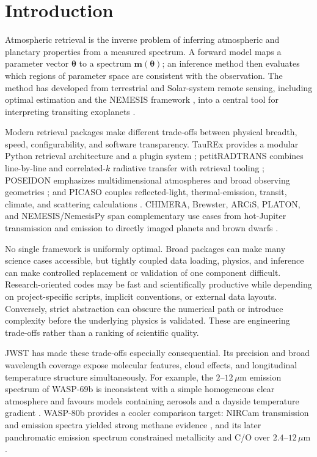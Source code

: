 \section{Introduction}
\label{sec:introduction}

Atmospheric retrieval is the inverse problem of inferring atmospheric and
planetary properties from a measured spectrum. A forward model maps a parameter
vector $\boldsymbol{\theta}$ to a spectrum $\boldsymbol{m}(\boldsymbol{\theta})$;
an inference method then evaluates which regions of parameter space are
consistent with the observation. The method has developed from terrestrial and
Solar-system remote sensing, including optimal estimation and the NEMESIS
framework \citep{Rodgers2000,Irwin2008}, into a central tool for interpreting
transiting exoplanets \citep[e.g.][]{MadhusudhanSeager2009,Line2013}.

Modern retrieval packages make different trade-offs between physical breadth,
speed, configurability, and software transparency. TauREx provides a modular
Python retrieval architecture and a plugin system \citep{AlRefaie2021};
petitRADTRANS combines line-by-line and correlated-$k$ radiative transfer with
retrieval tooling \citep{Molliere2019,Molliere2020}; POSEIDON emphasizes
multidimensional atmospheres and broad observing geometries
\citep{MacDonald2017,MacDonald2024}; and PICASO couples reflected-light,
thermal-emission, transit, climate, and scattering calculations
\citep{Batalha2019,Batalha2022}. CHIMERA, Brewster, ARCiS, PLATON, and
NEMESIS/NemesisPy span complementary use cases from hot-Jupiter transmission
and emission to directly imaged planets and brown dwarfs
\citep{Line2013,Burningham2017,Min2020,Zhang2019,Irwin2008}.

No single framework is uniformly optimal. Broad packages can make many science
cases accessible, but tightly coupled data loading, physics, and inference can
make controlled replacement or validation of one component difficult.
Research-oriented codes may be fast and scientifically productive while
depending on project-specific scripts, implicit conventions, or external data
layouts. Conversely, strict abstraction can obscure the numerical path or
introduce complexity before the underlying physics is validated. These are
engineering trade-offs rather than a ranking of scientific quality.

JWST has made these trade-offs especially consequential. Its precision and
broad wavelength coverage expose molecular features, cloud effects, and
longitudinal temperature structure simultaneously. For example, the
$2$--$12\,\mu$m emission spectrum of WASP-69b is inconsistent with a simple
homogeneous clear atmosphere and favours models containing aerosols and a
dayside temperature gradient \citep{Schlawin2024}. WASP-80b provides a cooler
comparison target: NIRCam transmission and emission spectra yielded strong
methane evidence \citep{Bell2023}, and its later panchromatic emission spectrum
constrained metallicity and C/O over $2.4$--$12\,\mu$m
\citep{WASP80Panchromatic2025}.

